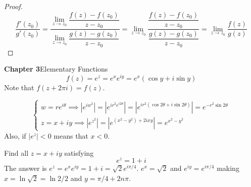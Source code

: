 \begin{proof}
\[\dfrac{f'(z_0)}{g'(z_0)}=\dfrac{\lim _{z\rightarrow z_0}\dfrac{f(z)-f(z_0)}{z-z_0}}{\lim _{z\rightarrow z_0}\dfrac{g(z)-g(z_0)}{z-z_0}}=\lim _{z\rightarrow z_0}\dfrac{\dfrac{f(z)-f(z_0)}{z-z_0}}{\dfrac{g(z)-g(z_0)}{z-z_0}}=\lim _{z\rightarrow z_0}\dfrac{f(z)}{g(z)}\]
\end{proof}
\vspace{2ex}
{\bf Chapter 3}\hspace{2ex}Elementary Functions
\\
\[f(z)=e^{z}=e^{x}e^{iy}=e^{x}(\cos y+i\sin y)\]
Note that $f(z+2\pi i)=f(z)$.
\\
\begin{rmk}
\[\begin{cases}
w=re^{i\theta }\implies |e^{iw^2}|=|e^{ir^2e^{i2\theta }}|=|e^{ir^2(\cos 2\theta +i\sin 2\theta )}|=e^{-r^2\sin 2\theta }\\
z=x+iy\implies |e^{z^2}|=|e^{(x^2-y^2)+2ixy}|=e^{x^2-y^2}
\end{cases}\]
Also, if $|e^{z}|<0$ means that $x<0$.
\end{rmk}
\vspace{2ex}
\begin{ex}
Find all $z=x+iy$ satisfying 
\[e^{z}=1+i\]
The answer is $e^{z}=e^{x}e^{iy}=1+i=\sqrt{2}e^{i\pi/4}$. $e^{x}=\sqrt{2}$ and $e^{iy}=e^{i\pi /4}$ making $x=\ln\sqrt{2}=\ln 2/2$ and $y=\pi/4+2n\pi $.
\end{ex}
\vspace{2ex}


